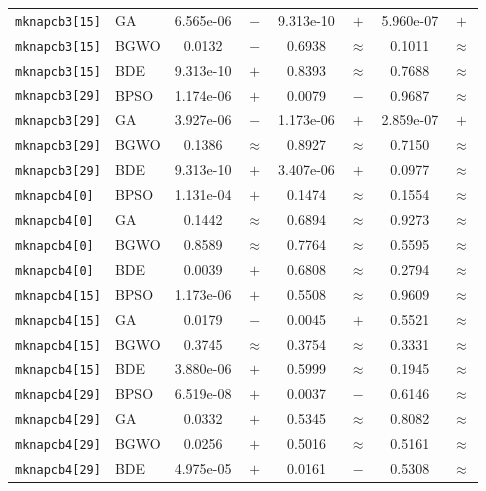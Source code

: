 \documentclass[journal,article,submit,moreauthors]{Definitions/mdpi}
\begin{document}
\begin{longtable}{llcccccc}
    \texttt{mknapcb3[15]} & GA    & 6.565e-06 & $-$ & 9.313e-10 & $+$ & 5.960e-07 & $+$ \\
    \texttt{mknapcb3[15]} & BGWO  &    0.0132 & $-$ &    0.6938 & $\approx$ &    0.1011 & $\approx$ \\
    \texttt{mknapcb3[15]} & BDE   & 9.313e-10 & $+$ &    0.8393 & $\approx$ &    0.7688 & $\approx$ \\
    \midrule
    \texttt{mknapcb3[29]} & BPSO  & 1.174e-06 & $+$ &    0.0079 & $-$ &    0.9687 & $\approx$ \\
    \texttt{mknapcb3[29]} & GA    & 3.927e-06 & $-$ & 1.173e-06 & $+$ & 2.859e-07 & $+$ \\
    \texttt{mknapcb3[29]} & BGWO  &    0.1386 & $\approx$ &    0.8927 & $\approx$ &    0.7150 & $\approx$ \\
    \texttt{mknapcb3[29]} & BDE   & 9.313e-10 & $+$ & 3.407e-06 & $+$ &    0.0977 & $\approx$ \\
    \midrule
    \texttt{mknapcb4[0]} & BPSO  & 1.131e-04 & $+$ &    0.1474 & $\approx$ &    0.1554 & $\approx$ \\
    \texttt{mknapcb4[0]} & GA    &    0.1442 & $\approx$ &    0.6894 & $\approx$ &    0.9273 & $\approx$ \\
    \texttt{mknapcb4[0]} & BGWO  &    0.8589 & $\approx$ &    0.7764 & $\approx$ &    0.5595 & $\approx$ \\
    \texttt{mknapcb4[0]} & BDE   &    0.0039 & $+$ &    0.6808 & $\approx$ &    0.2794 & $\approx$ \\
    \midrule
    \texttt{mknapcb4[15]} & BPSO  & 1.173e-06 & $+$ &    0.5508 & $\approx$ &    0.9609 & $\approx$ \\
    \texttt{mknapcb4[15]} & GA    &    0.0179 & $-$ &    0.0045 & $+$ &    0.5521 & $\approx$ \\
    \texttt{mknapcb4[15]} & BGWO  &    0.3745 & $\approx$ &    0.3754 & $\approx$ &    0.3331 & $\approx$ \\
    \texttt{mknapcb4[15]} & BDE   & 3.880e-06 & $+$ &    0.5999 & $\approx$ &    0.1945 & $\approx$ \\
    \midrule
    \texttt{mknapcb4[29]} & BPSO  & 6.519e-08 & $+$ &    0.0037 & $-$ &    0.6146 & $\approx$ \\
    \texttt{mknapcb4[29]} & GA    &    0.0332 & $+$ &    0.5345 & $\approx$ &    0.8082 & $\approx$ \\
    \texttt{mknapcb4[29]} & BGWO  &    0.0256 & $+$ &    0.5016 & $\approx$ &    0.5161 & $\approx$ \\
    \texttt{mknapcb4[29]} & BDE   & 4.975e-05 & $+$ &    0.0161 & $-$ &    0.5308 & $\approx$ \\

\end{longtable}
\end{document}
